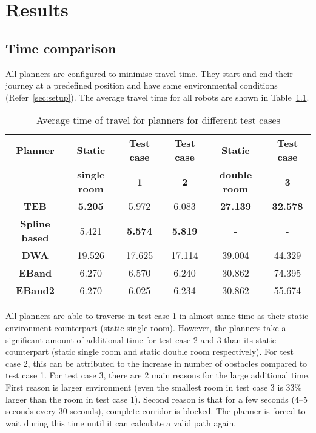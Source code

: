 
\chapter{Results}


\section{Time comparison}%
\label{sec:time_comparison}


All planners are configured to minimise travel time. They start and end their journey at a predefined
position and have same environmental conditions (Refer~\ref{sec:setup}). The average travel time for all robots are shown
in Table~\ref{tab:avg_time_planner_comp}. 

\begin{table}[!htpb]
    \centering
    \begin{tabular}{cccccc}\toprule
        \textbf{Planner} & \textbf{Static} & \textbf{Test case} & \textbf{Test case} & \textbf{Static} & \textbf{Test case} \\
                         & \textbf{single room} & \textbf{1} & \textbf{2} & \textbf{double room}       & \textbf{3} \\\toprule
        \textbf{TEB         } & \textbf{5.205}  & 5.972  & 6.083  & \textbf{27.139} & \textbf{32.578} \\
        \textbf{Spline based} & 5.421  & \textbf{5.574}  & \textbf{5.819}  & \--    & \--    \\
        \textbf{DWA         } & 19.526 & 17.625 & 17.114 & 39.004 & 44.329 \\
        \textbf{EBand       } & 6.270  & 6.570  & 6.240  & 30.862 & 74.395 \\
        \textbf{EBand2      } & 6.270  & 6.025  & 6.234  & 30.862 & 55.674 \\
        \bottomrule
    \end{tabular}
    \caption{Average time of travel for planners for different test cases}\label{tab:avg_time_planner_comp}
\end{table}

All planners are able to traverse in test case 1 in almost
same time as their static environment counterpart (static single room). However, the planners take a 
significant amount of additional time for test case 2 and 3 than its static counterpart (static 
single room and static double room respectively). For test case 2, this can be attributed to the 
increase in number of obstacles compared to test case 1. For test case 3, there are 2 main reasons
for the large additional time. First reason is larger environment (even the smallest room in test
case 3 is 33\% larger than the room in test case 1). Second reason is that for a few seconds (4--5 
seconds every 30 seconds), complete corridor is blocked. The planner is forced to wait during this 
time until it can calculate a valid path again. 


